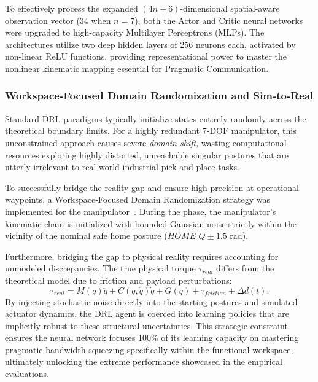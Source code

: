 To effectively process the expanded $(4n+6)$-dimensional spatial-aware observation vector (34 when $n=7$), both the Actor and Critic neural networks were upgraded to high-capacity Multilayer Perceptrons (MLPs). The architectures utilize two deep hidden layers of 256 neurons each, activated by non-linear ReLU functions, providing representational power to master the nonlinear kinematic mapping essential for Pragmatic Communication.

\subsubsection{Workspace-Focused Domain Randomization and Sim-to-Real}
Standard DRL paradigms typically initialize states entirely randomly across the theoretical boundary limits. For a highly redundant 7-DOF manipulator, this unconstrained approach causes severe \textit{domain shift}, wasting computational resources exploring highly distorted, unreachable singular postures that are utterly irrelevant to real-world industrial pick-and-place tasks.

To successfully bridge the reality gap and ensure high precision at operational waypoints, a Workspace-Focused Domain Randomization strategy was implemented for the manipulator~\cite{DRTDN,SRTRC}. During the  phase, the manipulator's kinematic chain is initialized with bounded Gaussian noise strictly within the vicinity of the nominal safe home posture ($HOME\_Q \pm 1.5$ rad). 

Furthermore, bridging the gap to physical reality requires accounting for unmodeled discrepancies. The true physical torque $\tau_{real}$ differs from the theoretical model due to friction and payload perturbations:
\begin{equation}
    \tau_{real} = M(q)\ddot{q} + C(q,\dot{q})\dot{q} + G(q) + \tau_{friction} + \Delta d(t).
\end{equation}
By injecting stochastic noise directly into the starting postures and simulated actuator dynamics, the DRL agent is coerced into learning policies that are implicitly robust to these structural uncertainties. This strategic constraint ensures the neural network focuses 100\% of its learning capacity on mastering pragmatic bandwidth squeezing specifically within the functional workspace, ultimately unlocking the extreme performance showcased in the empirical evaluations.

